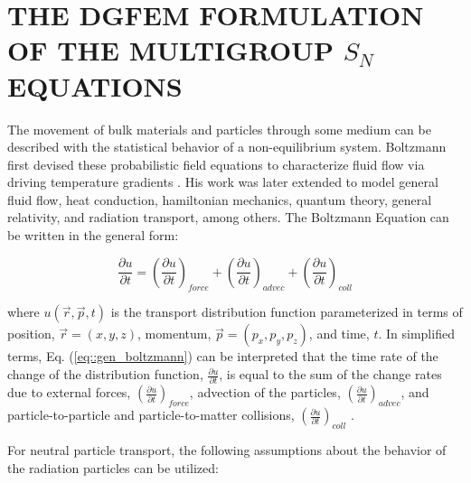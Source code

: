 %
%
%
\chapter{\uppercase {The DGFEM Formulation of the Multigroup $S_N$ Equations}}
\label{sec::Sn}

The movement of bulk materials and particles through some medium can be described with the statistical behavior of a non-equilibrium system. Boltzmann first devised these probabilistic field equations to characterize fluid flow via driving temperature gradients \cite{encyc_physics}. His work was later extended to model general fluid flow, heat conduction, hamiltonian mechanics, quantum theory, general relativity, and radiation transport, among others. The Boltzmann Equation can be written in the general form:

\begin{equation}
\label{eq::gen_boltzmann}
\frac{\partial u}{\partial t} = \left( \frac{\partial u}{\partial t}  \right)_{force} + \left( \frac{\partial u}{\partial t}  \right)_{advec} + \left( \frac{\partial u}{\partial t}  \right)_{coll}
\end{equation}

\noindent where $u(\vec{r},\vec{p},t)$ is the transport distribution function parameterized in terms of position, $\vec{r}=(x,y,z)$, momentum, $\vec{p}=(p_x,p_y,p_z)$, and time, $t$. In simplified terms, Eq. (\ref{eq::gen_boltzmann}) can be interpreted that the time rate of the change of the distribution function, $\frac{\partial u}{\partial t}$, is equal to the sum of the change rates due to external forces, $\left( \frac{\partial u}{\partial t}  \right)_{force} $, advection of the particles, $\left( \frac{\partial u}{\partial t}  \right)_{advec}$, and particle-to-particle and particle-to-matter collisions, $\left( \frac{\partial u}{\partial t}  \right)_{coll}$ \cite{mcgraw_physics}. 

For neutral particle transport, the following assumptions \cite{duderstadt1979transport} about the behavior of the radiation particles can be utilized:

